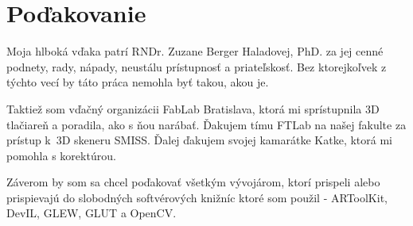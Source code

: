 \thispagestyle{empty}
\chapter*{Poďakovanie}
Moja hlboká vďaka patrí RNDr. Zuzane Berger Haladovej, PhD. za jej cenné podnety, rady, nápady, neustálu prístupnosť a priateľskosť. Bez ktorejkoľvek z týchto vecí by táto práca nemohla byť takou, akou je.

Taktiež som vďačný organizácii FabLab Bratislava, ktorá mi sprístupnila 3D tlačiareň a poradila, ako s ňou narábať. Ďakujem tímu FTLab na našej fakulte za prístup k~3D skeneru SMISS. Ďalej ďakujem svojej kamarátke Katke, ktorá mi pomohla s korektúrou.

Záverom by som sa chcel poďakovať všetkým vývojárom, ktorí prispeli alebo prispievajú do slobodných softvérových knižníc ktoré som použil - ARToolKit, DevIL, GLEW, GLUT a OpenCV.
\pagebreak
